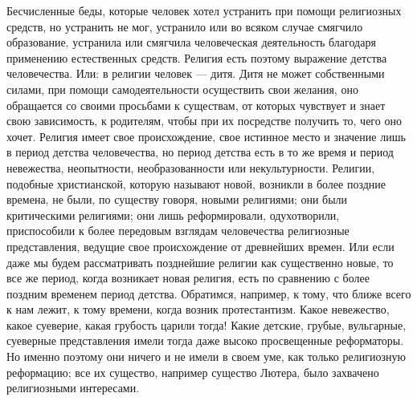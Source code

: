 \documentclass[12pt]{article}
\begin{document}
Бесчисленные беды, которые человек хотел устранить при помощи религиозных средств, но устранить не мог, устранило или во всяком случае смягчило образование, устранила или смягчила человеческая деятельность благодаря применению естественных средств. Религия есть поэтому выражение детства человечества. Или: в религии человек --- дитя. Дитя не может собственными силами, при помощи самодеятельности осуществить свои желания, оно обращается со своими просьбами к существам, от которых чувствует и знает свою зависимость, к родителям, чтобы при их посредстве получить то, чего оно хочет. Религия имеет свое происхождение, свое истинное место и значение лишь в период детства человечества, но период детства есть в то же время и период невежества, неопытности, необразованности или некультурности. Религии, подобные христианской, которую называют новой, возникли в более поздние времена, не были, по существу говоря, новыми религиями; они были критическими религиями; они лишь реформировали, одухотворили, приспособили к более передовым взглядам человечества религиозные представления, ведущие свое происхождение от древнейших времен. Или если даже мы будем рассматривать позднейшие религии как существенно новые, то все же период, когда возникает новая религия, есть по сравнению с более поздним временем период детства. Обратимся, например, к тому, что ближе всего к нам лежит, к тому времени, когда возник протестантизм. Какое невежество, какое суеверие, какая грубость царили тогда! Какие детские, грубые, вульгарные, суеверные представления имели тогда даже высоко просвещенные реформаторы. Но именно поэтому они ничего и не имели в своем уме, как только религиозную реформацию; все их существо, например существо Лютера, было захвачено религиозными интересами. 
\end{document}
